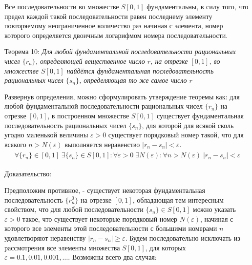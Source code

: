 \documentclass[12pt]{article}
\begin{document}
Все последовательности во множестве $S[0, 1]$ фундаментальны, в силу того, что предел каждой такой последовательности равен последнему элементу повторяемому неограниченное количество раз начиная с элемента, номер которого определяется двоичным логарифмом номера последовательности. 

Теорема 10: {\sl Для любой фундаментальной последовательности рациональных чисел $\{r_n\}$, определяющей вещественное число $r$, на отрезке $[0,1]$, во множестве $S[0, 1]$ найдётся фундаментальная последовательность рациональных чисел $\{s_n\}$, определяющая то же самое число $r$}

Развернув определения, можно сформулировать утверждение теоремы как: для любой фундаментальной последовательности рациональных чисел $\{r_n\}$ на отрезке $[0, 1]$, в построенном множестве $S[0, 1]$ существует фундаментальная последовательность рациональных чисел $\{s_n\}$, для которой для всякой сколь угодно маленькой величины $\varepsilon > 0$ существует порядковый номер такой, что для всякого $n > N(\varepsilon)$ выполняется неравенство $|r_n - s_n| < \varepsilon$.
\begin{align}
\begin{split}
\forall \{r_n\} \in [0, 1] \; \exists \{s_n\} \in S[0, 1]: \forall \varepsilon > 0 \; \exists N(\varepsilon): \forall n > N(\varepsilon) \; |r_n - s_n| < \varepsilon
\end{split}
\end{align}

Доказательство: 

Предположим противное, - существует некоторая фундаментальная последовательность $\{r^0_n\}$ на отрезке $[0, 1]$, обладающая тем интересным свойством, что для любой последовательности $\{s_n\} \in S[0, 1]$ можно указать $\varepsilon > 0$ такое, что существует некоторые порядковый номер $N(\varepsilon)$, начиная с которого все элементы этой последовательности с большими номерами $n$ удовлетворяют неравенству $|r_n - s_n| \geq \varepsilon$. Будем последовательно исключать из рассмотрения все элементы множества $S[0, 1]$, для которых $\varepsilon = 0.1, 0.01, 0.001, \dots$. Возможны всего два случая: 
\end{document}
